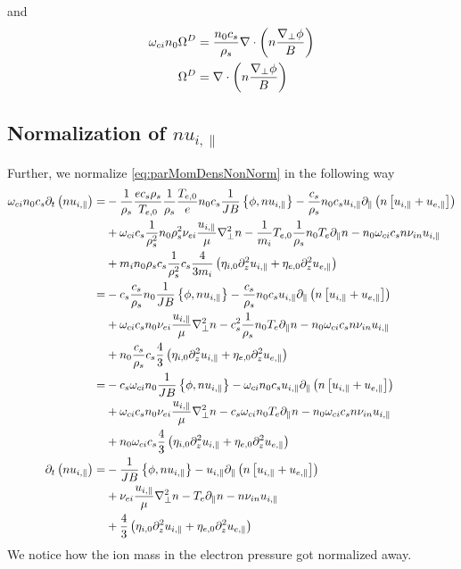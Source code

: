 %
and
%
\begin{align*}
    \omega_{ci}n_0\Omega^D &= \frac{n_0 c_s}{\rho_s}\nabla\cdot\left(n\frac{\nabla_\perp\phi}{B}\right)\\
    \Omega^D &= \nabla\cdot\left(n\frac{\nabla_\perp\phi}{B}\right)
\end{align*}
%

\subsection{Normalization of \texorpdfstring{$nu_{i,\|}$}{the parallel momentum density}}
%
Further, we normalize \cref{eq:parMomDensNonNorm} in the following way
%
\begin{align*}
    \omega_{ci}n_0c_s\partial_t\left( n u_{i,\|}\right)
 =&
 -\frac{1}{\rho_s}\frac{ec_s\rho_s}{T_{e,0}}\frac{1}{\rho_s}\frac{T_{e,0}}{e}n_0c_s\frac{1}{JB}\left\{\phi, n u_{i,\|}\right\}
 - \frac{c_s}{\rho_s}n_0c_s u_{i,\|}\partial_\|\left( n \left[u_{i,\|}+ u_{e,\|} \right]\right)
   \\&
 + \omega_{ci}c_s\frac{1}{\rho_s^2}n_0\rho_s^2\nu_{ei} \frac{u_{i,\|}}{\mu} \nabla_\perp^2 n
 - \frac{1}{m_i}T_{e,0}\frac{1}{\rho_s}n_0T_e \partial_\| n
 - n_0\omega_{ci}c_s n \nu_{i n}u_{i,\|}
   \\&
 + m_in_0\rho_sc_s\frac{1}{\rho_s^2}c_s\frac{4}{3m_i}\left(\eta_{i,0} \partial_z^2 u_{i,\|}
 + \eta_{e,0}\partial_z^2 u_{e,\|}\right)
 \\
 =&
 - c_s\frac{c_s}{\rho_s}n_0\frac{1}{JB}\left\{\phi, n u_{i,\|}\right\}
 - \frac{c_s}{\rho_s}n_0c_s u_{i,\|}\partial_\|\left( n \left[u_{i,\|}+ u_{e,\|} \right]\right)
   \\&
 + \omega_{ci}c_sn_0\nu_{ei} \frac{u_{i,\|}}{\mu} \nabla_\perp^2 n
 - c_s^2\frac{1}{\rho_s}n_0T_e \partial_\| n
 - n_0\omega_{ci}c_s n \nu_{i n}u_{i,\|}
   \\&
 + n_0\frac{c_s}{\rho_s}c_s\frac{4}{3}\left(\eta_{i,0} \partial_z^2 u_{i,\|}
 + \eta_{e,0}\partial_z^2 u_{e,\|}\right)
 \\
 =&
 - c_s\omega_{ci}n_0\frac{1}{JB}\left\{\phi, n u_{i,\|}\right\}
 - \omega_{ci}n_0c_s u_{i,\|}\partial_\|\left( n \left[u_{i,\|}+ u_{e,\|} \right]\right)
   \\&
 + \omega_{ci}c_sn_0\nu_{ei} \frac{u_{i,\|}}{\mu} \nabla_\perp^2 n
 - c_s\omega_{ci}n_0T_e \partial_\| n
 - n_0\omega_{ci}c_s n \nu_{i n}u_{i,\|}
   \\&
 + n_0\omega_{ci}c_s\frac{4}{3}\left(\eta_{i,0} \partial_z^2 u_{i,\|}
 + \eta_{e,0}\partial_z^2 u_{e,\|}\right)
 \\
  \partial_t\left( n u_{i,\|}\right)
 =&
 - \frac{1}{JB}\left\{\phi, n u_{i,\|}\right\}
 - u_{i,\|}\partial_\|\left( n \left[u_{i,\|}+ u_{e,\|} \right]\right)
   \\&
 + \nu_{ei} \frac{u_{i,\|}}{\mu} \nabla_\perp^2 n
 - T_e \partial_\| n
 - n \nu_{i n}u_{i,\|}
   \\&
 + \frac{4}{3}\left(\eta_{i,0} \partial_z^2 u_{i,\|}
 + \eta_{e,0}\partial_z^2 u_{e,\|}\right)
\end{align*}
%
We notice how the ion mass in the electron pressure got normalized away.

